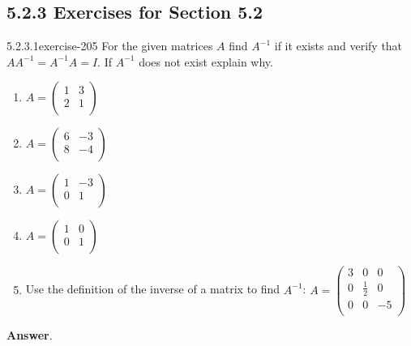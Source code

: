 \documentclass[twoside,10pt,]{book}
\numberwithin{equation}{section}
\begin{document}
\subsection*{5.2.3 Exercises for Section 5.2}
\begin{divisionsolution}{5.2.3.1}{}{exercise-205}%
\hypertarget{p-1813}{}%
For the given matrices \(A\) find \(A^{-1}\) if it exists and verify that \(A A^{-1}=A^{-1}A = I\).  If \(A^{-1}\) does not exist explain why.%
\par
\hypertarget{p-1814}{}%
\leavevmode%
\begin{enumerate}[label=(\alph*)]
\item\hypertarget{li-952}{}\(A = \left(
\begin{array}{cc}
1 & 3 \\
2 & 1 \\
\end{array}
\right)\)%
\item\hypertarget{li-953}{}\(A=\left(
\begin{array}{cc}
6 & -3 \\
8 & -4 \\
\end{array}
\right)\)%
\item\hypertarget{li-954}{}\(A = \left(
\begin{array}{cc}
1 & -3 \\
0 & 1 \\
\end{array}
\right)\)%
\item\hypertarget{li-955}{}\(A = \left(
\begin{array}{cc}
1 & 0 \\
0 & 1 \\
\end{array}
\right)\)%
\item\hypertarget{li-956}{}Use the definition of the inverse of a matrix to find \(A^{-1}\): \(A=\left(
\begin{array}{ccc}
3 & 0 & 0 \\
0 & \frac{1}{2} & 0 \\
0 & 0 & -5 \\
\end{array}
\right)\)%
\end{enumerate}
%
\par\smallskip%
\noindent\textbf{Answer}.\quad%
\hypertarget{p-1815}{}%
\leavevmode%
\begin{multicols}{2}
\begin{enumerate}[label=(\alph*)]

\end{enumerate}
\end{multicols}
\end{divisionsolution}
\end{document}

